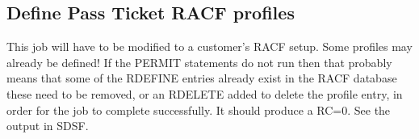 \documentclass[letterpaper,10pt,english]{sphinxmanual}
\begin{document}
\subsection{Define Pass Ticket RACF profiles}
\label{\detokenize{connectivity_guide:define-pass-ticket-racf-profiles}}
\sphinxAtStartPar
This job will have to be modified to a customer’s RACF setup. Some profiles may already be defined! If the PERMIT statements do not run then that probably means that some of the RDEFINE entries already exist in the RACF database \sphinxhyphen{} these need to be removed, or an RDELETE added to delete the profile entry, in order for the job to complete successfully. It should produce a RC=0. See the output in SDSF.

\begin{sphinxVerbatim}[commandchars=\\\{\}]
  
  
  
         
         
         
         
          
          \PYGZbs{} 
            
            
         \PYGZbs{}   
          
          
\end{sphinxVerbatim}
\end{document}
